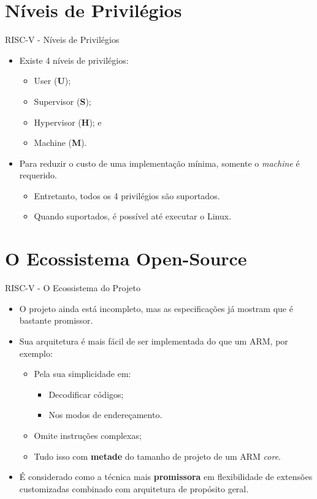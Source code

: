 \documentclass[aspectratio=169]{beamer}
\begin{document}
\section{Níveis de Privilégios}
\begin{frame}{RISC-V - Níveis de Privilégios}
	\begin{itemize}
		\item Existe 4 níveis de privilégios:
		\begin{itemize}
			\item User (\textbf{U});
			\item Supervisor (\textbf{S});
			\item Hypervisor (\textbf{H}); e
			\item Machine (\textbf{M}).
		\end{itemize}

		\item Para reduzir o custo de uma implementação mínima, somente o \textit{machine} é requerido.
		\begin{itemize}
			\item Entretanto, todos os 4 privilégios são suportados.
			\item Quando suportados, é possível até executar o Linux.
		\end{itemize}
	\end{itemize}
\end{frame}

\section{O Ecossistema Open-Source}
\begin{frame}{RISC-V - O Ecossistema do Projeto}
	\begin{itemize}
		\item O projeto ainda está incompleto, mas as especificações já mostram que é bastante promissor.
		\item Sua arquitetura é mais fácil de ser implementada do que um ARM, por exemplo:
		\begin{itemize}
			\item Pela sua simplicidade em:
			\begin{itemize}
				\item Decodificar códigos;
				\item Nos modos de endereçamento.
			\end{itemize}
			\item Omite instruções complexas;
			\item Tudo isso com \textbf{metade} do tamanho de projeto de um ARM \textit{core}.
		\end{itemize}
		\item É considerado como a técnica mais \textbf{promissora} em flexibilidade de extensões customizadas combinado com arquitetura de propósito geral.
	\end{itemize}
\end{frame}
\end{document}
